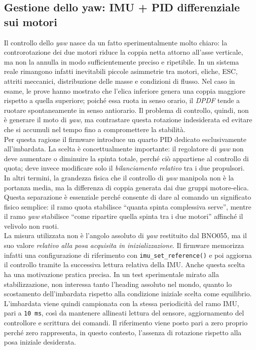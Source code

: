 \documentclass[11pt]{report}
\begin{document}
	
	
	\subsection{Gestione dello yaw: IMU + PID differenziale sui motori}
	Il controllo dello \textit{yaw} nasce da un fatto sperimentalmente molto chiaro: la controrotazione dei due motori riduce la coppia netta attorno all'asse verticale, ma non la annulla in modo sufficientemente preciso e ripetibile. In un sistema reale rimangono infatti inevitabili piccole asimmetrie tra motori, eliche, ESC, attriti meccanici, distribuzione delle masse e condizioni di flusso. Nel caso in esame, le prove hanno mostrato che l'elica inferiore genera una coppia maggiore rispetto a quella superiore; poiché essa ruota in senso orario, il \textit{DPDF} tende a ruotare spontaneamente in senso antiorario. Il problema di controllo, quindi, non è generare il moto di \textit{yaw}, ma contrastare questa rotazione indesiderata ed evitare che si accumuli nel tempo fino a compromettere la stabilità.\\
	Per questa ragione il firmware introduce un quarto PID dedicato esclusivamente all'imbardata. La scelta è concettualmente importante: il regolatore di \textit{yaw} non deve aumentare o diminuire la spinta totale, perché ciò appartiene al controllo di quota; deve invece modificare solo il \emph{bilanciamento relativo} tra i due propulsori. In altri termini, la grandezza fisica che il controllo di \textit{yaw} manipola non è la portanza media, ma la differenza di coppia generata dai due gruppi motore-elica. Questa separazione è essenziale perché consente di dare al comando un significato fisico semplice: il ramo quota stabilisce ``quanta spinta complessiva serve'', mentre il ramo \textit{yaw} stabilisce ``come ripartire quella spinta tra i due motori'' affinché il velivolo non ruoti.\\
	La misura utilizzata non è l'angolo assoluto di \textit{yaw} restituito dal BNO055, ma il suo valore \emph{relativo alla posa acquisita in inizializzazione}. Il firmware memorizza infatti una configurazione di riferimento con \texttt{imu\_set\_reference()} e poi aggiorna il controllo tramite la successiva lettura relativa della IMU. Anche questa scelta ha una motivazione pratica precisa. In un test sperimentale mirato alla stabilizzazione, non interessa tanto l'heading assoluto nel mondo, quanto lo scostamento dell'imbardata rispetto alla condizione iniziale scelta come equilibrio. L'imbardata viene quindi campionata con la stessa periodicità del ramo IMU, pari a \texttt{10 ms}, così da mantenere allineati lettura del sensore, aggiornamento del controllore e scrittura dei comandi. Il riferimento viene posto pari a zero proprio perché zero rappresenta, in questo contesto, l'assenza di rotazione rispetto alla posa iniziale desiderata.\\
\end{document}

